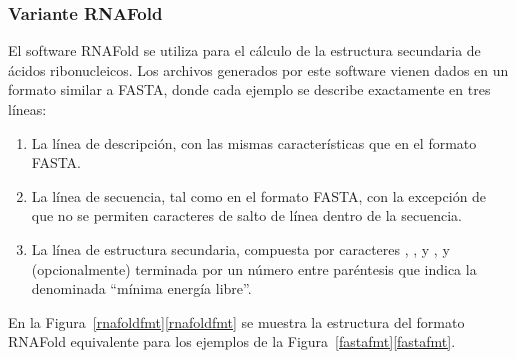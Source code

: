 %
\subsubsection{Variante RNAFold}
%
El software RNAFold \cite{vienna} se utiliza para el cálculo de la
estructura secundaria de ácidos ribonucleicos. Los archivos generados
por este software vienen dados en un formato similar a FASTA, donde
cada ejemplo se describe exactamente en tres líneas:
%
\begin{enumerate}
\item La línea de descripción, con las mismas características que en
  el formato FASTA.
\item La línea de secuencia, tal como en el formato FASTA, con la
  excepción de que no se permiten caracteres de salto de línea dentro
  de la secuencia.
\item La línea de estructura secundaria, compuesta por caracteres
  \mono{(}, \mono{)}, y , y (opcionalmente) terminada por un
  número entre paréntesis que indica la denominada ``mínima energía
  libre''.
\end{enumerate}
%
En la \iflatexml{}Figura~\ref{rnafoldfmt}\else\autoref{rnafoldfmt}\fi{} se
muestra la estructura del formato RNAFold equivalente para los ejemplos de
la \iflatexml{}Figura~\ref{fastafmt}\else\autoref{fastafmt}\fi.
